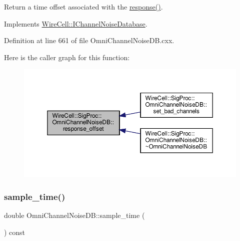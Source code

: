 Return a time offset associated with the \hyperlink{class_wire_cell_1_1_sig_proc_1_1_omni_channel_noise_d_b_ae269e377629b9a96c8e0cdb0f30353a4}{response()}. 



Implements \hyperlink{class_wire_cell_1_1_i_channel_noise_database_a5a1d081b5cd6d32ac7209b99eb2c61dc}{Wire\+Cell\+::\+I\+Channel\+Noise\+Database}.



Definition at line 661 of file Omni\+Channel\+Noise\+D\+B.\+cxx.

Here is the caller graph for this function\+:
\nopagebreak
\begin{figure}[H]
\begin{center}
\leavevmode
\includegraphics[width=350pt]{class_wire_cell_1_1_sig_proc_1_1_omni_channel_noise_d_b_a0b6fa7b4d342adf1313b86684b811023_icgraph}
\end{center}
\end{figure}
\mbox{\label{class_wire_cell_1_1_sig_proc_1_1_omni_channel_noise_d_b_a33769e729aab08e5320647cd4c04304c}} 
\subsubsection{\texorpdfstring{sample\+\_\+time()}{sample\_time()}}
{\footnotesize\ttfamily double Omni\+Channel\+Noise\+D\+B\+::sample\+\_\+time (\begin{DoxyParamCaption}{ }\end{DoxyParamCaption}) const\hspace{0.3cm}{\ttfamily [virtual]}}



